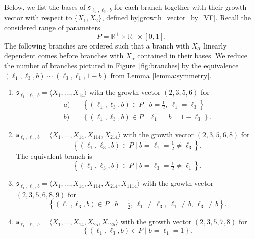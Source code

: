 \documentclass{amsart}
\theoremstyle{plain}
\theoremstyle{definition}
\theoremstyle{remark}
\newcommand{\R}{\mathbb{R}}
\newcommand{\mfk}[1]{\mathfrak{#1}}
\begin{document}
Below, we list the bases of $\mfk{s}_{\ell_1,\ell_3,b}$ for each branch together with their growth vector with respect to $\{X_1,X_2\}$, defined by\eqref{growth_vector_by_VF}. Recall the considered range of parameters
\[P = \R^+ \times \R^+ \times [0,1].\]
The following branches are ordered such that a branch with $X_\alpha$ linearly dependent comes before branches with $X_\alpha$ contained in their bases.
We reduce the number of branches pictured in Figure~\ref{fig:branches} by the equivalence $(\ell_1, \ell_3,b) \sim (\ell_3, \ell_1, 1-b)$ from Lemma \ref{lemma:symmetry}.
\begin{enumerate}[label=\arabic*)]
    \item $\mfk{s}_{\ell_1,\ell_3,b} = \langle X_1, \dots, X_{14} \rangle$ with the growth vector $(2,3,5,6)$ for
        \begin{equation*}
        \begin{aligned}
            a)&\quad \left\{ (\ell_1,\ell_3,b) \in P \mid b = \tfrac{1}{2},\ \ell_1 = \ell_3 \right\}\\
            b)&\quad \left\{ (\ell_1,\ell_3,b) \in P \mid \ell_1 = b = 1 - \ell_3 \right\}.
        \end{aligned}
        \end{equation*}\label{branch_list_1}
    \item $\mfk{s}_{\ell_1,\ell_3,b} = \langle X_1, \dots, X_{14}, X_{114}, X_{214} \rangle$ with the growth vector $(2,3,5,6,8)$ for
        \begin{equation*}
            \left\{ (\ell_1,\ell_3,b) \in P \mid b = \ell_1 = \tfrac 1 2 \neq \ell_3 \right\}.
        \end{equation*}
        The equivalent branch is
        \[ \left\{ (\ell_1,\ell_3,b) \in P \mid b = \ell_3 = \tfrac 1 2 \neq \ell_1 \right\}. \]
    \item $\mfk{s}_{\ell_1,\ell_3,b} = \langle X_1, \dots, X_{14}, X_{114}, X_{214}, X_{1114} \rangle$ with the growth vector $(2,3,5,6,8,9)$ for
        \begin{equation*}
            \left\{ (\ell_1,\ell_3,b) \in P \mid b = \tfrac{1}{2},\ \ell_1 \neq \ell_3,\ \ell_1\ne b,\ \ell_3\ne b \right\}.
        \end{equation*}
    \item $\mfk{s}_{\ell_1,\ell_3,b} = \langle X_1, \dots, X_{14}, X_{25}, X_{125} \rangle$ with the growth vector $(2,3,5,7,8)$ for
        \begin{equation*}
            \left\{ (\ell_1,\ell_3,b) \in P \mid b = \ell_1 = 1 \right\}.

\end{equation*}
\end{enumerate}
\end{document}

